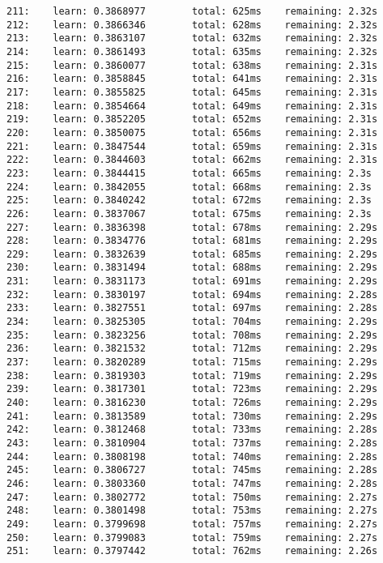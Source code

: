 \documentclass[11pt]{article}
\begin{document}
\begin{Verbatim}[commandchars=\\\{\}]
211:    learn: 0.3868977        total: 625ms    remaining: 2.32s
212:    learn: 0.3866346        total: 628ms    remaining: 2.32s
213:    learn: 0.3863107        total: 632ms    remaining: 2.32s
214:    learn: 0.3861493        total: 635ms    remaining: 2.32s
215:    learn: 0.3860077        total: 638ms    remaining: 2.31s
216:    learn: 0.3858845        total: 641ms    remaining: 2.31s
217:    learn: 0.3855825        total: 645ms    remaining: 2.31s
218:    learn: 0.3854664        total: 649ms    remaining: 2.31s
219:    learn: 0.3852205        total: 652ms    remaining: 2.31s
220:    learn: 0.3850075        total: 656ms    remaining: 2.31s
221:    learn: 0.3847544        total: 659ms    remaining: 2.31s
222:    learn: 0.3844603        total: 662ms    remaining: 2.31s
223:    learn: 0.3844415        total: 665ms    remaining: 2.3s
224:    learn: 0.3842055        total: 668ms    remaining: 2.3s
225:    learn: 0.3840242        total: 672ms    remaining: 2.3s
226:    learn: 0.3837067        total: 675ms    remaining: 2.3s
227:    learn: 0.3836398        total: 678ms    remaining: 2.29s
228:    learn: 0.3834776        total: 681ms    remaining: 2.29s
229:    learn: 0.3832639        total: 685ms    remaining: 2.29s
230:    learn: 0.3831494        total: 688ms    remaining: 2.29s
231:    learn: 0.3831173        total: 691ms    remaining: 2.29s
232:    learn: 0.3830197        total: 694ms    remaining: 2.28s
233:    learn: 0.3827551        total: 697ms    remaining: 2.28s
234:    learn: 0.3825305        total: 704ms    remaining: 2.29s
235:    learn: 0.3823256        total: 708ms    remaining: 2.29s
236:    learn: 0.3821532        total: 712ms    remaining: 2.29s
237:    learn: 0.3820289        total: 715ms    remaining: 2.29s
238:    learn: 0.3819303        total: 719ms    remaining: 2.29s
239:    learn: 0.3817301        total: 723ms    remaining: 2.29s
240:    learn: 0.3816230        total: 726ms    remaining: 2.29s
241:    learn: 0.3813589        total: 730ms    remaining: 2.29s
242:    learn: 0.3812468        total: 733ms    remaining: 2.28s
243:    learn: 0.3810904        total: 737ms    remaining: 2.28s
244:    learn: 0.3808198        total: 740ms    remaining: 2.28s
245:    learn: 0.3806727        total: 745ms    remaining: 2.28s
246:    learn: 0.3803360        total: 747ms    remaining: 2.28s
247:    learn: 0.3802772        total: 750ms    remaining: 2.27s
248:    learn: 0.3801498        total: 753ms    remaining: 2.27s
249:    learn: 0.3799698        total: 757ms    remaining: 2.27s
250:    learn: 0.3799083        total: 759ms    remaining: 2.27s
251:    learn: 0.3797442        total: 762ms    remaining: 2.26s

\end{Verbatim}
\end{document}
